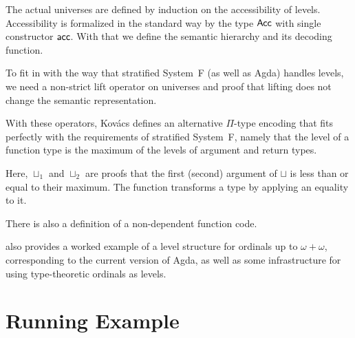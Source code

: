 \documentclass[manuscript,screen,review,anonymous]{acmart}
\begin{document}
\begin{minipage}{0.45\linewidth}
\UUirSpec
\UUir  
\end{minipage}
\begin{minipage}{0.45\linewidth}
\UElirSpec
\UElir
\end{minipage}

The actual universes are defined by induction on the accessibility of
levels. Accessibility is formalized in the standard way by the type
$\AAcc$ with single constructor $\Aacc$.
\UUless
With that we define the semantic hierarchy and its decoding function.

\begin{minipage}{0.45\linewidth}
  \UU
\end{minipage}
\begin{minipage}{0.45\linewidth}
  \UEl
\end{minipage}

To fit in with the way that stratified System~F (as well as Agda)
handles levels, we need a non-strict lift operator on universes and
proof that lifting does not change the semantic representation.

\begin{minipage}{0.45\linewidth}
  \ULiftLe
\end{minipage}
\begin{minipage}{0.45\linewidth}
  \UElLiftLe
\end{minipage}

With these operators, Kov\'{a}cs defines an alternative $\Pi$-type encoding that fits perfectly
with the requirements of stratified System~F, namely that the level of
a function type is the maximum of the levels of argument and return types.
\UAltPi

Here, $\sqcup_1$ and $\sqcup_2$ are proofs that the first (second)
argument of $\sqcup$ is less than or equal to their maximum. The
function {\Acoe} transforms a type by applying an equality to it.

There is also a definition of a non-dependent function code.

\UFun

\citet{DBLP:conf/csl/Kovacs22} also provides a worked example of a
level structure for ordinals up to $\omega+\omega$, corresponding to
the current version of Agda, as well as some infrastructure for
using type-theoretic ordinals as levels.

\section{Running Example}
\label{sec:running-example}
\end{document}
